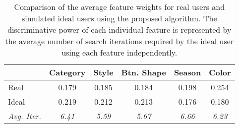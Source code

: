 \documentclass[journal]{IEEEtran}
\begin{document}
\begin{table}[t]
\caption{Comparison of the average feature weights for real users and simulated ideal users using the proposed algorithm. The discriminative power of each individual feature is represented by the average number of search iterations required by the ideal user using each feature independently.}
\label{tab::weight}
\small
\centering
\vspace{+1ex}
\begin{tabular}{|l|c|c|c|c|c|}
\hline
  & Category & Style & Btn. Shape & Season & Color  \\
\hline
Real & 0.179 & 0.185 & 0.184 & 0.198 & 0.254 \\
\hline
Ideal & 0.219 & 0.212 & 0.213 & 0.176 & 0.180 \\
\hline
\hline
\textit{Avg. Iter.} &\textit{6.41} &\textit{5.59} &\textit{5.67} &\textit{6.66} &\textit{6.23} \\
\hline
\end{tabular}
\end{table}
\end{document}
